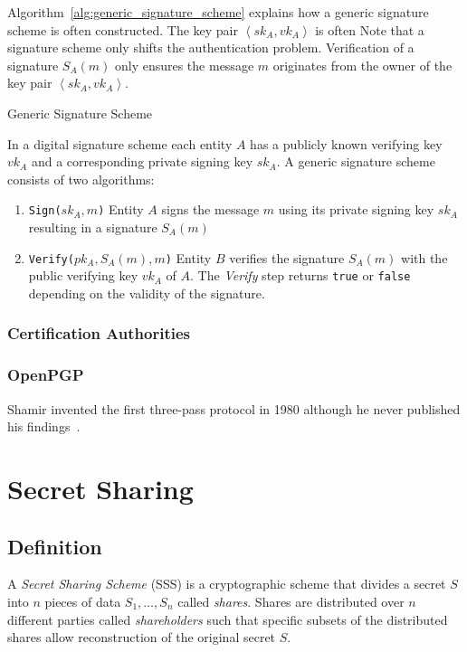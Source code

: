 Algorithm~\ref{alg:generic_signature_scheme} explains how a generic signature scheme is often constructed. The key pair $\left< sk_A, vk_A \right>$ is often  Note that a signature scheme only shifts the authentication problem. Verification of a signature $S_A \left( m \right)$ only ensures the message $m$ originates from the owner of the key pair $\left< sk_A, vk_A \right>$.
\begin{algorithm}
\caption{Generic Signature Scheme }
\label{alg:generic_signature_scheme}
 In a digital signature scheme each entity $A$ has a publicly known verifying key $vk_A$ and a corresponding private signing key $sk_A$. A generic signature scheme consists of two algorithms:
 \begin{enumerate}
  \item \texttt{Sign($sk_A, m$)} Entity $A$ signs the message $m$ using its private signing key $sk_A$ resulting in a signature $S_A \left( m \right)$
  \item \texttt{Verify($pk_A, S_A \left( m \right), m$)} Entity $B$ verifies the signature $S_A \left( m \right)$ with the public verifying key $vk_A$ of $A$. The \textit{Verify} step returns \texttt{true} or \texttt{false} depending on the validity of the signature.
 \end{enumerate}
\end{algorithm}


\subsubsection{Certification Authorities} 

\subsubsection{OpenPGP}

Shamir invented the first three-pass protocol in 1980 although he never published his findings~\cite{art:Massey88}.

\section{Secret Sharing}

\subsection{Definition}
\begin{defn}[SSS]
\label{def:secret_sharing_scheme}
 A \textit{Secret Sharing Scheme} (SSS) is a cryptographic scheme that divides a secret $S$ into $n$ pieces of data $S_1, \ldots, S_n$ called \textit{shares}. Shares are distributed over $n$ different parties called \textit{shareholders} such that specific subsets of the distributed shares allow reconstruction of the original secret $S$.
\end{defn}

